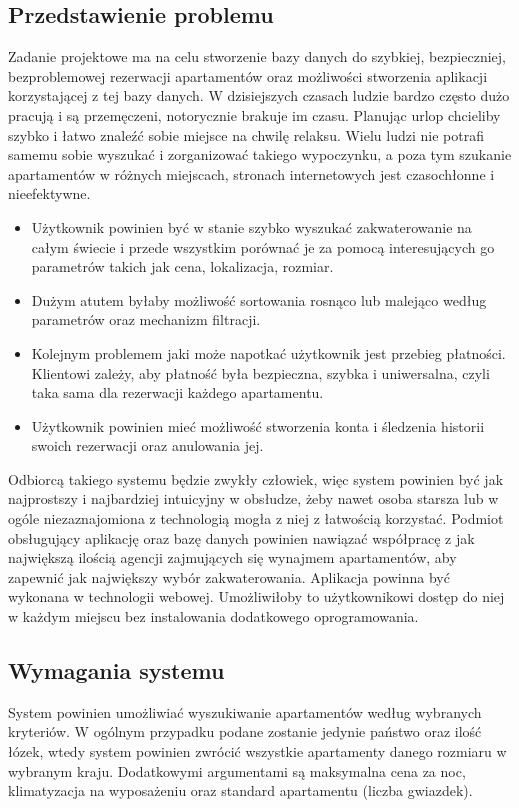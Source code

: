 \documentclass[polish, 11pt]{article}
\begin{document}
    \subsection{Przedstawienie problemu}
    Zadanie projektowe ma na celu stworzenie bazy danych do szybkiej, bezpieczniej, bezproblemowej rezerwacji apartamentów oraz możliwości stworzenia
    aplikacji korzystającej z tej bazy danych. 
    W dzisiejszych czasach ludzie bardzo często dużo pracują i są przemęczeni, notorycznie brakuje im czasu. Planując urlop chcieliby szybko
    i łatwo znaleźć sobie miejsce na chwilę relaksu. Wielu ludzi nie potrafi samemu sobie wyszukać i zorganizować takiego wypoczynku, a poza tym
    szukanie apartamentów w różnych miejscach, stronach internetowych jest czasochłonne i nieefektywne.
	\begin{itemize}
     \item Użytkownik powinien być w stanie szybko wyszukać zakwaterowanie na całym świecie i przede wszystkim porównać je za pomocą interesujących go parametrów takich jak cena, lokalizacja, rozmiar.
     \item Dużym atutem byłaby możliwość sortowania rosnąco lub malejąco według parametrów oraz mechanizm filtracji.
     \item Kolejnym problemem jaki może napotkać użytkownik jest przebieg płatności. Klientowi zależy, aby płatność była bezpieczna, szybka i uniwersalna,
     czyli taka sama dla rezerwacji każdego apartamentu.
     \item Użytkownik powinien mieć możliwość stworzenia konta i śledzenia historii swoich rezerwacji oraz
     anulowania jej.
    \end{itemize}
    Odbiorcą takiego systemu będzie zwykły człowiek, więc system powinien być jak najprostszy i najbardziej intuicyjny w obsłudze, 
    żeby nawet osoba starsza lub w ogóle niezaznajomiona z technologią mogła z niej z łatwością korzystać.
    Podmiot obsługujący aplikację oraz bazę danych powinien nawiązać 
    współpracę z jak największą ilością agencji zajmujących się wynajmem apartamentów, aby zapewnić jak największy wybór zakwaterowania.  
    Aplikacja powinna być wykonana w technologii webowej. Umożliwiłoby to użytkownikowi dostęp do niej w każdym miejscu bez
    instalowania dodatkowego oprogramowania.
       
    \subsection{Wymagania systemu}
        System powinien umożliwiać wyszukiwanie apartamentów według wybranych kryteriów.
        W ogólnym przypadku podane zostanie jedynie państwo oraz ilość łózek,
        wtedy system powinien zwrócić wszystkie apartamenty danego rozmiaru w wybranym kraju.
        Dodatkowymi argumentami są maksymalna cena za noc,
        klimatyzacja na wyposażeniu oraz standard apartamentu (liczba gwiazdek).
\end{document}
